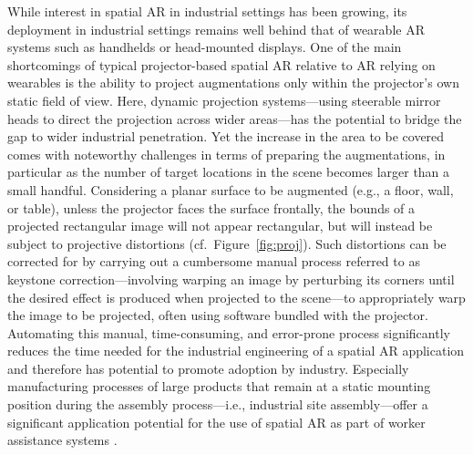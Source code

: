 \documentclass[review]{elsarticle}
\begin{document}
While interest in spatial AR in industrial settings has been growing, its deployment in industrial settings remains well behind that of wearable AR systems such as handhelds or head-mounted displays. One of the main shortcomings of typical projector-based spatial AR relative to AR relying on wearables is the ability to project augmentations only within the projector's own static field of view. Here, dynamic projection systems---using steerable mirror heads to direct the projection across wider areas---has the potential to bridge the gap to wider industrial penetration. Yet the increase in the area to be covered comes with noteworthy challenges in terms of preparing the augmentations, in particular as the number of target locations in the scene becomes larger than a small handful. Considering a planar surface to be augmented (e.g., a floor, wall, or table), unless the projector faces the surface frontally, the bounds of a projected rectangular image will not appear rectangular, but will instead be subject to projective distortions (cf.\ Figure~\ref{fig:proj}). Such distortions can be corrected for by carrying out a cumbersome manual process referred to as keystone correction---involving warping an image by perturbing its corners until the desired effect is produced when projected to the scene---to appropriately warp the image to be projected, often using software bundled with the projector. Automating this manual, time-consuming, and error-prone process significantly reduces the time needed for the industrial engineering of a spatial AR application and therefore has potential to promote adoption by industry. Especially manufacturing processes of large products that remain at a static mounting position during the assembly process---i.e., industrial site assembly---offer a significant application potential for the use of spatial AR as part of worker assistance systems \cite{mayrhofer2019one}.
\end{document}
